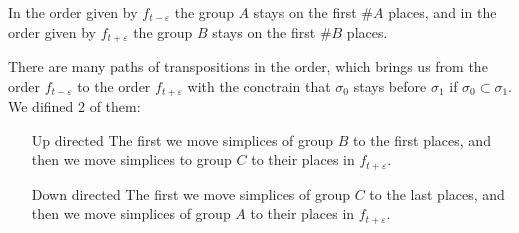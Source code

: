 In the order given by $f_{t - \varepsilon}$ the group $A$ stays on the first $\#A$ places, and in the order given by $f_{t + \varepsilon}$ the group $B$ stays on the first $\#B$ places.
\par There are many paths of transpositions in the order, which brings us from the order $f_{t - \varepsilon}$ to the order $f_{t + \varepsilon}$ with the conctrain that $\sigma_0$ stays before $\sigma_1$ if $\sigma_0 \subset \sigma_1$. We difined 2 of them:
\begin{itemize}
    \item[Up directed] The first we move simplices of group $B$ to the first places, and then we move simplices to group $C$ to their places in $f_{t + \varepsilon}$.
    \item[Down directed] The first we move simplices of group $C$ to the last places, and then we move simplices of group $A$ to their places in $f_{t + \varepsilon}$.
\end{itemize}